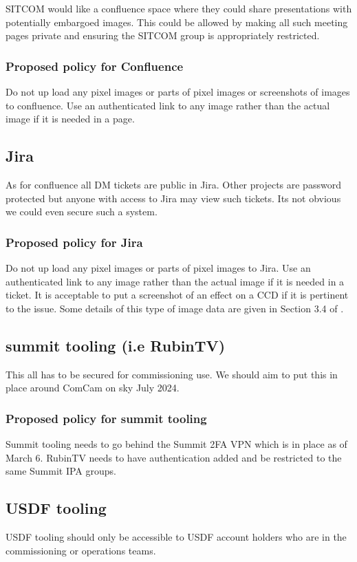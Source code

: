SITCOM would like a confluence space where they could share presentations with potentially embargoed images.
This could be allowed by making all such meeting pages private and ensuring the SITCOM group is appropriately restricted.

\subsubsection{Proposed policy for Confluence}
Do not up load any pixel images or parts of pixel images or screenshots of images to confluence.
Use an authenticated link to any image rather than the actual image if it is needed in a page.




\subsection{Jira}
As for confluence all DM tickets are public in Jira.
Other projects are password protected but anyone with access to Jira may view such tickets.
Its not obvious we could even secure such a system.

\subsubsection{Proposed policy for Jira}
Do not up load any pixel images or parts of pixel images to Jira.
Use an authenticated link to any image rather than the actual image if it is needed in a ticket.
It is acceptable to put a screenshot of an effect on a CCD if it is pertinent to the issue.
Some details of this type of image data are given in Section 3.4 of .

\subsection{summit tooling (i.e RubinTV)}
This all has to be secured for commissioning use.
We should aim to put this in place around ComCam on sky July 2024.

\subsubsection{Proposed policy for summit tooling}
Summit tooling needs to go behind the Summit 2FA VPN which is in place as of March 6.
RubinTV needs to have authentication added and be restricted to the same Summit IPA groups.

\subsection{USDF tooling}
USDF tooling should only be accessible to USDF account holders who are in the commissioning or operations teams.
